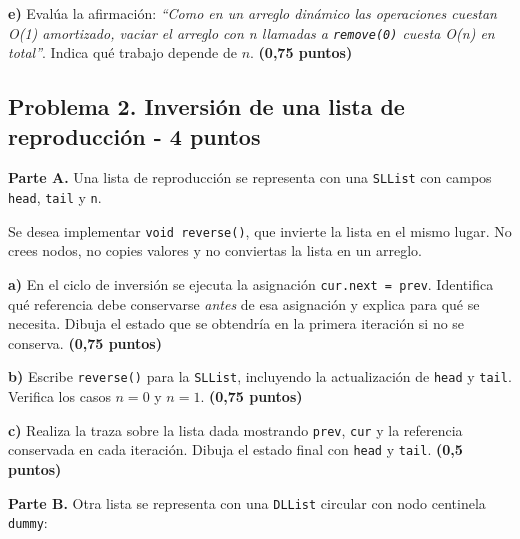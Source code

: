 \documentclass[11pt,a4paper]{article}
\newcommand{\chain}[3]{%
\foreach \v [count=\i] in {#1} {
  \node[ln] (c\i) at (\i*#3,0) {\v};
  \ifnum\i>1 \pgfmathtruncatemacro{\p}{\i-1}\draw[#2] (c\p) -- (c\i);\fi
}}
\newcommand{\pts}[1]{\textbf{(#1)}}
\begin{document}
\textbf{e)} Evalúa la afirmación: \emph{``Como en un arreglo dinámico las operaciones cuestan O(1) amortizado, vaciar el arreglo con n llamadas a \texttt{remove(0)} cuesta O(n) en total''}. Indica qué trabajo depende de $n$. \pts{0,75 puntos}

\newpage
\subsection*{Problema 2. Inversión de una lista de reproducción - 4 puntos}

\textbf{Parte A.} Una lista de reproducción se representa con una \texttt{SLList} con campos \texttt{head}, \texttt{tail} y \texttt{n}.

\begin{center}
\end{center}

Se desea implementar \texttt{void reverse()}, que invierte la lista en el mismo lugar. No crees nodos, no copies valores y no conviertas la lista en un arreglo.

\textbf{a)} En el ciclo de inversión se ejecuta la asignación \texttt{cur.next = prev}. Identifica qué referencia debe conservarse \emph{antes} de esa asignación y explica para qué se necesita. Dibuja el estado que se obtendría en la primera iteración si no se conserva. \pts{0,75 puntos}

\textbf{b)} Escribe \texttt{reverse()} para la \texttt{SLList}, incluyendo la actualización de \texttt{head} y \texttt{tail}. Verifica los casos $n = 0$ y $n = 1$. \pts{0,75 puntos}

\textbf{c)} Realiza la traza sobre la lista dada mostrando \texttt{prev}, \texttt{cur} y la referencia conservada en cada iteración. Dibuja el estado final con \texttt{head} y \texttt{tail}. \pts{0,5 puntos}

\medskip
\textbf{Parte B.} Otra lista se representa con una \texttt{DLList} circular con nodo centinela \texttt{dummy}:

\begin{center}
\end{center}
\end{document}
